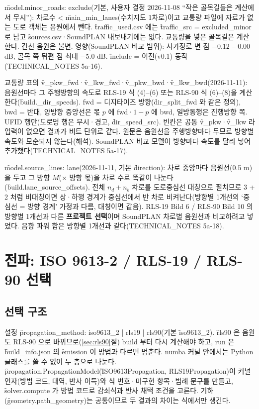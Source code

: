 \documentclass[10.5pt,a4paper]{article}
\begin{document}
 \f{model.minor\_roads: exclude}(기본, 사용자 결정 2026-11-08 ``작은 골목길들은 계산에서 무시''): 차로수 < \f{main\_min\_lanes}(수치지도 1차로)이고 교통량 파일에 자료가 없는 도로 객체는 음원에서 뺀다. \f{traffic\_used.csv} 에는 \f{traffic\_src = excluded\_minor} 로 남고 \f{sources.csv}·SoundPLAN 내보내기에는 없다. 교통량을 넣은 골목길은 계산한다. 간선 음원은 불변. 영향(SoundPLAN 비교 범위): 사가정로 변 점 −0.12 – 0.00 dB, 골목 쪽 뒤편 점 최대 −5.0 dB. \f{include} = 이전(v0.1) 동작(TECHNICAL\_NOTES 5a-16).

 교통량 표의 \f{v\_pkw\_fwd}·\f{v\_lkw\_fwd}·\f{v\_pkw\_bwd}·\f{v\_lkw\_bwd}(2026-11-11): 음원선마다 그 주행방향의 속도로 RLS-19 식 (4)–(6) 또는 RLS-90 식 (6)–(8)을 계산한다(\f{build.\_dir\_speeds}). fwd = 디지타이즈 방향(\f{dir\_split\_fwd} 와 같은 정의), bwd = 반대, 양방향 중앙선은 몫 $p$ 에 fwd·$1-p$ 에 bwd, 일방통행은 진행방향 쪽. UFID 행만(도로명 행은 무시·경고, \f{dir\_speed\_src}). 빈칸은 공통 \f{v\_pkw}·\f{v\_lkw} 라 입력이 없으면 결과가 비트 단위로 같다. 원문은 음원선을 주행방향마다 두므로 방향별 속도와 모순되지 않는다(해석). SoundPLAN 비교 모델이 방향마다 속도를 달리 넣어 추가했다(TECHNICAL\_NOTES 5a-17).

 \f{model.source\_lines: lane}(2026-11-11, 기본 \f{direction}): 차로 중앙마다 음원선(0.5 m)을 두고 그 방향 $M$(× 방향 몫)을 차로 수로 똑같이 나눈다(\f{build.lane\_source\_offsets}). 전체 $n_d + n_b$ 차로를 도로중심선 대칭으로 펼치므로 3 + 2 처럼 비대칭이면 상·하행 경계가 중심선에서 반 차로 비켜난다(방향별 1개선의 `중심선 = 방향 경계' 가정과 다름, 대칭이면 같음). RLS-19 Bild 6 / RLS-90 Bild 10 의 방향별 1개선과 다른 \textbf{프로젝트 선택}이며 SoundPLAN 차로별 음원선과 비교하려고 넣었다. 음향 파워 합은 방향별 1개선과 같다(TECHNICAL\_NOTES 5a-18).

\section{전파: ISO 9613-2 / RLS-19 / RLS-90 선택}

\subsection{선택 구조}
설정 \f{propagation\_method: iso9613\_2 | rls19 | rls90}(기본 \f{iso9613\_2}). \f{rls90} 은 음원도 RLS-90 으로 바뀌므로(\ref{sec:rls90}절) build 부터 다시 계산해야 하고, run 은 \f{build\_info.json} 의 \f{emission} 이 방법과 다르면 멈춘다. numba 커널 안에서는 Python 클래스를 쓸 수 없어 두 층으로 나눈다. \f{propagation.PropagationModel}(\f{ISO9613Propagation}, \f{RLS19Propagation})이 커널 인자(방법 코드, 대역, 반사 이득)와 식 번호·미구현 항목·범례 문구를 만들고, \f{solver.compute} 가 방법 코드로 감쇠식과 반사 채택 조건을 고른다. 기하(\f{geometry.path\_geometry})는 공통이므로 두 결과의 차이는 식에서만 생긴다.
\end{document}
